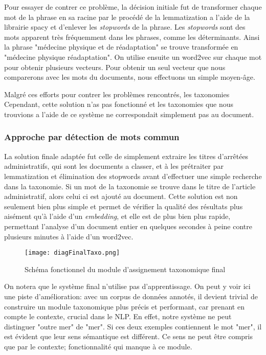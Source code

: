 Pour essayer de contrer ce problème, la décision initiale fut de transformer chaque mot de la phrase en sa racine par le procédé de la lemmatization a l'aide de la librairie spacy\cite{spacy} et d'enlever les \textit{stopwords} de la phrase.
Les \textit{stopwords} sont des mots apparent très fréquemment dans les phrases, comme les déterminants.
Ainsi la phrase "médecine physique et de réadaptation" se trouve transformée en "médecine physique réadaptation".
On utilise ensuite un word2vec sur chaque mot pour obtenir plusieurs vecteurs. Pour obtenir un seul vecteur que nous comparerons avec les mots du documents, nous effectuons un simple moyen-âge.

Malgré ces efforts pour contrer les problèmes rencontrés, les taxonomies
Cependant, cette solution n'as pas fonctionné et les taxonomies que nous trouvions a l'aide de ce système ne correspondait simplement pas au document. 

\subsubsection{Approche par détection de mots commun}
La solution finale adaptée fut celle de simplement extraire les titres d'arrêtées administratifs, qui sont les documents a classer, et à les prétraiter par lemmatization et élimination des stopwords avant d'effectuer une simple recherche dans la taxonomie.
Si un mot de la taxonomie se trouve dans le titre de l'article administratif, alors celui ci est ajouté au document. Cette solution est non seulement bien plus simple et permet de vérifier la qualité des résultats plus aisément qu'à l'aide d'un \textit{embedding}, et elle est de plus bien plus rapide, permettant l'analyse d'un document entier en quelques secondes à peine contre plusieurs minutes à l'aide d'un word2vec.

\begin{figure}[h!]
  \centering
  \texttt{[image: diagFinalTaxo.png]}
	\caption[]{Schéma fonctionnel du module d'assignement taxonomique final}
  \label{taxoFinal}
\end{figure}

On notera que le système final n'utilise pas d'apprentissage.
On peut y voir ici une piste d'amélioration: avec un corpus de données annotés, il devient trivial de construire un module taxonomique plus précis et performant, car prenant en compte le contexte, crucial dans le NLP.
En effet, notre système ne peut distinguer "outre mer" de "mer". Si ces deux exemples contiennent le mot "mer", il est évident que leur sens sémantique est différent. Ce sens ne peut être compris que par le contexte; fonctionnalité qui manque à ce module. 

